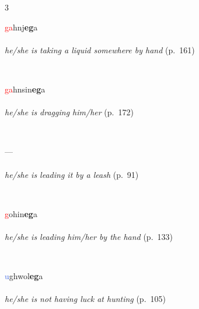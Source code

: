 \documentclass[oneside,openany]{book}%
\begin{document}
\begin{multicols}{3}
\begin{minipage}[t]{\linewidth}
\raggedright\noindent \textcolor{Red}{ga}hnj\textbf{eg}a\\
\\
\noindent \textit{he/she is taking a liquid somewhere by hand} (p.~161)
\end{minipage}\\[1em]%
\begin{minipage}[t]{\linewidth}
\raggedright\noindent \textcolor{Red}{ga}hnsin\textbf{eg}a\\
\\
\noindent \textit{he/she is dragging him/her} (p.~172)
\end{minipage}\\[1em]%
\begin{minipage}[t]{\linewidth}
\raggedright\noindent ---\\
\\
\noindent \textit{he/she is leading it by a leash} (p.~91)
\end{minipage}\\[1em]%
\begin{minipage}[t]{\linewidth}
\raggedright\noindent \textcolor{Red}{g}ohin\textbf{eg}a\\
\\
\noindent \textit{he/she is leading him/her by the hand} (p.~133)
\end{minipage}\\[1em]%
\begin{minipage}[t]{\linewidth}
\raggedright\noindent \textcolor{RoyalBlue}{u}ghwol\textbf{eg}a\\
\\
\noindent \textit{he/she is not having luck at hunting} (p.~105)
\end{minipage}\\[1em]%
\end{multicols}%
\vspace{1em}%
\needspace{1.5in}%
\end{document}
